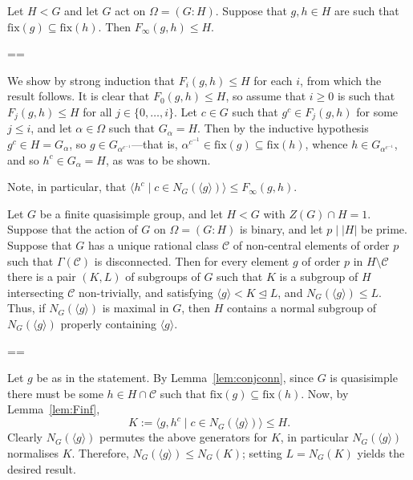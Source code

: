 \documentclass[11pt, a4paper]{amsart}
\makeatletter
\newcommand\fix{\mathrm{fix}}
\renewcommand{\proofname}{Proof}
\renewenvironment{proof}[1][\proofname]{\par
  \pushQED{\qed}  \normalfont \partopsep=\z@skip \topsep=\z@skip
  \trivlist
  \item[\hskip\labelsep
        \scshape
    #1\@addpunct{.}]\ignorespaces
}{  \popQED\endtrivlist\@endpefalse
}
\makeatother
\begin{document}
\begin{lemma}\label{lem:Finf}
    Let $H<G$ and let $G$ act on $\Omega=(G:H)$. Suppose that $g,h\in H$ are such that $\mathrm{fix}(g)\subseteq \mathrm{fix}(h)$. Then $F_\infty(g,h)\leq H.$
\end{lemma}
\begin{proof}
We show by strong induction that $F_i(g,h)\leq H$ for each $i$, from which the result follows. It is clear that $F_0(g,h)\leq H$, so assume that $i\geq 0$ is such that $F_j(g,h)\leq H$ for all $j\in\{0,\dots,i\}$. Let $c\in G$ such that $g^c\in F_j(g,h)$ for some $j\leq i$, and let $\alpha\in\Omega$ such that $G_\alpha=H$. Then by the inductive hypothesis $g^c\in H=G_{\alpha}$, so $g\in G_{\alpha^{c^{-1}}}$---that is, $\alpha^{c^{-1}}\in\mathrm{fix}(g)\subseteq\mathrm{fix}(h)$, whence $h\in G_{\alpha^{c^{-1}}}$, and so $h^c\in G_\alpha=H$, as was to be shown.
\end{proof}
\begin{rk}
    Note, in particular, that $\langle h^c \mid c\in N_G(\langle g\rangle)\rangle\leq F_\infty(g,h).$
\end{rk}
  
\begin{lemma}\label{lem:normalsub}
 Let $G$ be a finite quasisimple group, and let $H<G$ with $Z(G)\cap H=1$. Suppose that the action of $G$ on $\Omega=(G:H)$ is binary, and let $p\mid |H|$ be prime. Suppose that $G$ has a unique rational class $\mathcal{C}$ of non-central elements of order $p$ such that $\Gamma(\mathcal{C})$ is disconnected.  Then for every element $g$ of order $p$ in $H\setminus\mathcal{C}$ there is a pair $(K,L)$ of subgroups of $G$ such that $K$ is a subgroup of $H$ intersecting $\mathcal{C}$ non-trivially, and satisfying $\langle g\rangle<K\trianglelefteq L$, and $N_G(\langle g\rangle)\leq L$. Thus, if $N_G(\langle g\rangle)$ is maximal in $G$, then $H$ contains a normal subgroup of $N_G(\langle g\rangle)$ properly containing $\langle g\rangle$.
\end{lemma}

\begin{proof}
Let $g$ be as in the statement. By Lemma~\ref{lem:conjconn}, since $G$ is quasisimple there must be some $h\in H\cap \mathcal{C}$ such that $\fix(g)\subseteq\fix(h)$. Now, by Lemma~\ref{lem:Finf}, $$K:=\langle g,h^c \mid c\in N_G(\langle g\rangle)\rangle\leq H.$$
Clearly $N_G(\langle g\rangle)$ permutes the above generators for $K$, in particular $N_G(\langle g\rangle)$ normalises $K$. Therefore, $N_G(\langle g\rangle)\leq N_G(K)$; setting $L=N_G(K)$ yields the desired result.\end{proof}
\end{document}
